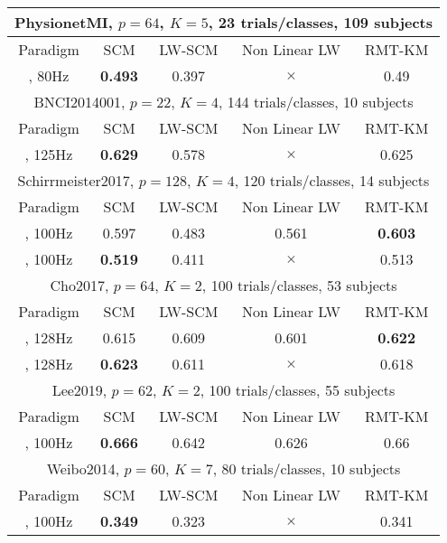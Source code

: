 \begin{table*}[]
    \centering
    \begin{tabular}{||c||c|c|c|c||}
    \hline
    \multicolumn{5}{|c|}{PhysionetMI, $p=64$, $K=5$, 23 trials/classes, 109 subjects} \\
    \hline
    Paradigm & SCM & LW-SCM & Non Linear LW & RMT-KM \\
    \hline
    [1,3], 80Hz & {\bf 0.493} & 0.397 & $\times$ & 0.49 \\
    \hline
    \hline
    \multicolumn{5}{|c|}{BNCI2014001, $p=22$, $K=4$, 144 trials/classes, 10 subjects} \\
    \hline
    Paradigm & SCM & LW-SCM & Non Linear LW & RMT-KM \\
    \hline
    [0,4], 125Hz & {\bf 0.629} & 0.578 & $\times$ & 0.625 \\
    \hline
    \hline
    \multicolumn{5}{|c|}{Schirrmeister2017, $p=128$, $K=4$, 120 trials/classes, 14 subjects} \\
    \hline
    Paradigm     & SCM         & LW-SCM & Non Linear LW & RMT-KM \\
    \hline
    [0,5], 100Hz & 0.597       & 0.483 & 0.561          & {\bf 0.603} \\
    \hline
    [3,5], 100Hz & {\bf 0.519} & 0.411 & $\times$       & 0.513 \\
    \hline
    \hline
    \multicolumn{5}{|c|}{Cho2017, $p=64$, $K=2$, 100 trials/classes, 53 subjects} \\
    \hline
    Paradigm & SCM & LW-SCM & Non Linear LW & RMT-KM \\
    \hline
    [1,3], 128Hz & 0.615 & 0.609 & 0.601 & {\bf 0.622} \\
    \hline
    [0,3], 128Hz & {\bf 0.623}& 0.611 & $\times$ & 0.618 \\
    \hline
    \hline
    \multicolumn{5}{|c|}{Lee2019, $p=62$, $K=2$, 100 trials/classes, 55 subjects} \\
    \hline
    Paradigm & SCM & LW-SCM & Non Linear LW & RMT-KM \\
    \hline
    [2,3], 100Hz & {\bf 0.666} & 0.642 & 0.626 & 0.66 \\
    \hline
    \hline
    \multicolumn{5}{|c|}{Weibo2014, $p=60$, $K=7$, 80 trials/classes, 10 subjects} \\
    \hline
    Paradigm & SCM & LW-SCM & Non Linear LW & RMT-KM \\
    \hline
    [0,4], 100Hz & {\bf 0.349} & 0.323 & $\times$ & 0.341 \\
    \hline

\end{tabular}
\end{table*}
